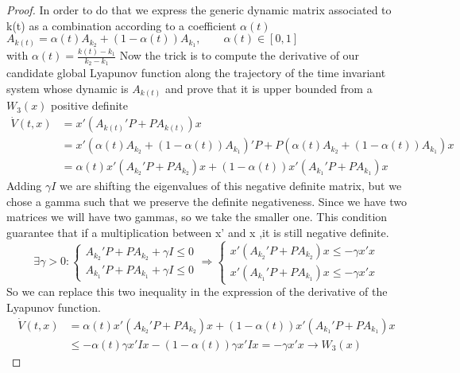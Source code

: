 \begin{proof}
	In order to do that we express the generic dynamic matrix associated to k(t) as a combination according to a coefficient $\alpha(t)$\\
	$A_{k(t)}=\alpha(t)A_{k_2}+(1-\alpha(t))A_{k_1}, \qquad \alpha(t)\in [0,1]$ \\
	with $\alpha(t)=\frac{k(t)-k_1}{k_2-k_1}$
Now the trick is to compute the derivative of our candidate global Lyapunov function along the trajectory of the time invariant system whose dynamic is $A_{k(t)}$ and prove that it is upper bounded from a $W_3(x)$ positive definite
\begin{align*}
	\dot{V}(t,x)&=x'(A_{k(t)}'P+PA_{k(t)})x \\
	&= x'(\alpha(t)A_{k_2}+(1-\alpha(t))A_{k_1})'P+P(\alpha(t)A_{k_2}+(1-\alpha(t))A_{k_1})x\\ &=\alpha(t)x'(A_{k_2}'P+PA_{k_2})x+(1-\alpha(t))x'(A_{k_1}'P+PA_{k_1})x
\end{align*}
Adding $\gamma I$ we are shifting the eigenvalues of this negative definite matrix, but we chose a gamma such that we preserve the definite negativeness. Since we have two matrices we will have two gammas, so we take the smaller one. This condition guarantee that if a multiplication between x' and x ,it is still negative definite.
\[
\exists\gamma>0\colon \begin{cases}
	A_{k_2}'P+PA_{k_2}+\gamma I \le0\\
A_{k_1}'P+PA_{k_1}+\gamma I \le0
\end{cases}\Rightarrow \begin{cases}
x'(A_{k_2}'P+PA_{k_2})x\le -\gamma x'x\\
x'(A_{k_1}'P+PA_{k_1})x\le -\gamma x'x
\end{cases}
\]
So we can replace this two inequality in the expression of the derivative of the Lyapunov function.
\begin{align*}
	\dot{V}(t,x)&=\alpha(t)x'(A_{k_2}'P+PA_{k_2})x+(1-\alpha(t))x'(A_{k_1}'P+PA_{k_1})x\\
	&\le -\alpha(t)\gamma x'Ix-(1-\alpha(t))\gamma x'Ix = -\boxed{\gamma x'x}\longrightarrow W_3(x)
\end{align*}
\end{proof}
